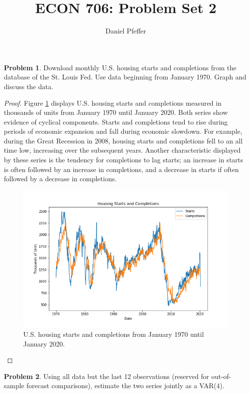 \documentclass[oneside,reqno]{amsart}
\title{ECON 706: Problem Set 2}
\author{Daniel Pfeffer}
\theoremstyle{definition}
\newtheorem{prob}{Problem}
\begin{document}
\maketitle

\begin{prob}
Download monthly U.S. housing starts and completions from the database of the St. Louis Fed. Use data beginning from January 1970. Graph and discuss the data.
\end{prob}

\begin{proof}
Figure \ref{plot-series} displays U.S. housing starts and completions measured in thousands of units from January 1970 until January 2020. Both series show evidence of cyclical components. Starts and completions tend to rise during periods of economic expansion and fall during economic slowdown. For example, during the Great Recession in 2008, housing starts and completions fell to an all time low, increasing over the subsequent years. Another characteristic displayed by these series is the tendency for completions to lag starts; an increase in starts is often followed by an increase in completions, and a decrease in starts if often followed by a decrease in completions.
\begin{figure}
\includegraphics[width=\textwidth]{plot-series}
\caption{U.S. housing starts and completions from January 1970 until January 2020.}
\label{plot-series}
\end{figure}
\end{proof}

\begin{prob}
Using all data but the last 12 observations (reserved for out-of-sample forecast comparisons), estimate the two series jointly as a VAR(4).
\end{prob}
\end{document}
